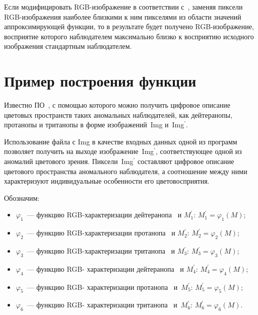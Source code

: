\begin{multicols}{2}
  Если модифицировать RGB-изоб\-ра\-же\-ние в соответствии с~\cite{10ar}, 
заменяя пиксели RGB-изоб\-ра\-же\-ния наиболее близкими к ним пикселями 
из области значений аппроксимирующей функции, то в результате будет 
получено RGB-изоб\-ра\-же\-ние, восприятие которого наблюдателем 
максимально близко к восприятию исходного изображения стандартным 
наблюдателем.
  
\section{Пример построения функции~}
  
  Известно ПО~\cite{5ar, 6ar}, с помощью которого можно получить цифровое 
описание цветовых пространств таких аномальных наблюдателей, как\linebreak 
дейтеранопы, протанопы и тританопы в форме изоб\-ра\-жений~Img 
и~Img$^\prime$. 
  
  Использование файла с Img в качестве входных данных одной из 
программ~\cite{5ar, 6ar} позволяет получить на выходе 
изображение~Img$^\prime$, со\-от\-вет\-ст\-ву\-ющее одной из аномалий цветового 
зрения. Пиксели~Img$^\prime$ составляют цифровое описание цветового 
пространства аномального наблюдателя, а соотношение между ними 
характеризуют индивидуальные особенности его цветовосприятия.
  
  Обозначим:
  \begin{itemize}
  \item[\ ] $\varphi_1$~--- функцию RGB-ха\-рак\-те\-ри\-за\-ции 
дейтеранопа~\cite{5ar} и $M^\prime_1$: $M^\prime_1=\varphi_1(M)$; 
  \item[\ ] $\varphi_2$~--- функцию RGB-ха\-рак\-те\-ри\-за\-ции 
протанопа~\cite{5ar} и $M^\prime_2$: $M^\prime_2=\varphi_2(M)$; 
  \item[\ ] $\varphi_3$~--- функцию RGB-ха\-рак\-те\-ри\-за\-ции 
тританопа~\cite{5ar} и $M^\prime_3$: $M^\prime_3=\varphi_3(M)$; 
  \item[\ ] $\varphi_4$~--- функцию RGB- ха\-рак\-те\-ри\-за\-ции 
дейтеранопа~\cite{6ar} и $M^\prime_4$: $M^\prime_4=\varphi_4(M)$; 
  \item[\ ] $\varphi_5$~--- функцию RGB- ха\-рак\-те\-ри\-за\-ции 
протанопа~\cite{6ar} и~$M^\prime_5$: $M^\prime_5=\varphi_5(M)$; 
  \item[\ ] $\varphi_6$~--- функцию RGB- ха\-рак\-те\-ри\-за\-ции 
тританопа~\cite{6ar} и~$M^\prime_6$: $M^\prime_6=\varphi_6(M)$.
  \end{itemize}
  

\end{multicols}
